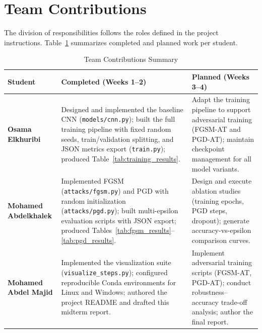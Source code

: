 \documentclass[conference,10pt]{IEEEtran}
\begin{document}
\section{Team Contributions}

The division of responsibilities follows the roles defined in the project
instructions. Table~\ref{tab:contributions} summarizes completed and planned
work per student.

\begin{table}[H]
\caption{Team Contributions Summary}
\label{tab:contributions}
\centering
\renewcommand{\arraystretch}{1.25}
\begin{tabular}{p{} p{} p{}}
\hline
\textbf{Student} & \textbf{Completed (Weeks 1--2)} & \textbf{Planned (Weeks 3--4)} \\
\hline
\textbf{Osama Elkhuribi} &
    Designed and implemented the baseline CNN (\texttt{models/cnn.py});
    built the full training pipeline with fixed random seeds,
    train/validation splitting, and JSON metrics export
    (\texttt{train.py}); produced Table~\ref{tab:training_results}. &
    Adapt the training pipeline to support adversarial training
    (FGSM-AT and PGD-AT); maintain checkpoint management for
    all model variants. \\
\hline
\textbf{Mohamed Abdelkhalek} &
    Implemented FGSM (\texttt{attacks/fgsm.py}) and PGD with random
    initialization (\texttt{attacks/pgd.py}); built multi-epsilon
    evaluation scripts with JSON export; produced
    Tables~\ref{tab:fgsm_results}--\ref{tab:pgd_results}. &
    Design and execute ablation studies (training epochs, PGD steps,
    dropout); generate accuracy-vs-epsilon comparison curves. \\
\hline
\textbf{Mohamed Abdel Majid } &
    Implemented the visualization suite (\texttt{visualize\_steps.py});
    configured reproducible Conda environments for Linux and Windows;
    authored the project README and drafted this midterm report. &
    Implement adversarial training scripts (FGSM-AT, PGD-AT);
    conduct robustness--accuracy trade-off analysis; author the
    final report. \\
\hline
\end{tabular}
\end{table}
\end{document}
